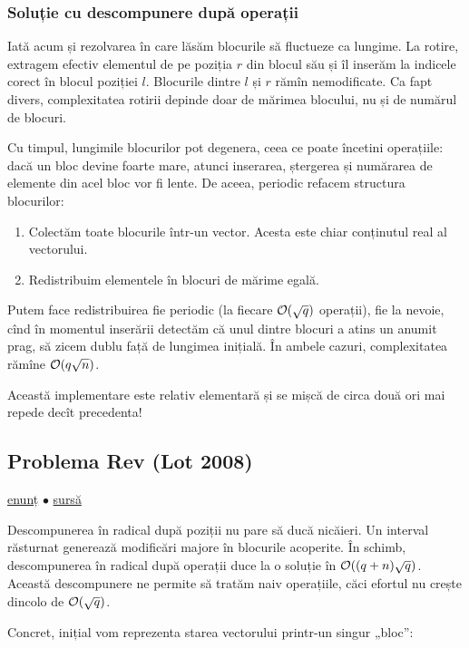 \documentclass[../main.tex]{subfiles}
\begin{document}
\subsubsection*{Soluție cu descompunere după operații}

Iată acum și rezolvarea în care lăsăm blocurile să fluctueze ca lungime. La rotire, extragem efectiv elementul de pe poziția $r$ din blocul său și îl inserăm la indicele corect în blocul poziției $l$. Blocurile dintre $l$ și $r$ rămîn nemodificate. Ca fapt divers, complexitatea rotirii depinde doar de mărimea blocului, nu și de numărul de blocuri.

Cu timpul, lungimile blocurilor pot degenera, ceea ce poate încetini operațiile: dacă un bloc devine foarte mare, atunci inserarea, ștergerea și numărarea de elemente din acel bloc vor fi lente. De aceea, periodic refacem structura blocurilor:

\begin{enumerate}
  \item Colectăm toate blocurile într-un vector. Acesta este chiar conținutul real al vectorului.
  \item Redistribuim elementele în blocuri de mărime egală.
\end{enumerate}

Putem face redistribuirea fie periodic (la fiecare $\mathcal{O}(\sqrt{q})$ operații), fie la nevoie, cînd în momentul inserării detectăm că unul dintre blocuri a atins un anumit prag, să zicem dublu față de lungimea inițială. În ambele cazuri, complexitatea rămîne $\mathcal{O}(q \sqrt{n})$.

Această implementare este relativ elementară și se mișcă de circa două ori mai repede decît precedenta!

\subsection{Problema Rev (Lot 2008)}
\label{problem:rev}

\href{https://kilonova.ro/problems/2316}{enunț}
$\bullet$
\hyperref[code:rev]{sursă}

Descompunerea în radical după poziții nu pare să ducă nicăieri. Un interval răsturnat generează modificări majore în blocurile acoperite. În schimb, descompunerea în radical după operații duce la o soluție în $\mathcal{O}((q  + n) \sqrt{q})$. Această descompunere ne permite să tratăm naiv operațiile, căci efortul nu crește dincolo de $\mathcal{O}(\sqrt{q})$.

Concret, inițial vom reprezenta starea vectorului printr-un singur „bloc”:
\end{document}
